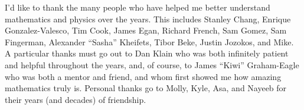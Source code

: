 I'd like to thank the many people who have helped me better understand
mathematics and physics over the years. This includes Stanley Chang,
Enrique Gonzalez-Valesco, Tim Cook, James Egan, Richard French, Sam Gomez,
Sam Fingerman, Alexander ``Sasha'' Kheifets, Tibor Beke, Justin Jozokos, and
Mike. A particular thanks must go out to Dan Klain who was both infinitely
patient and helpful throughout the years, and, of course, to James ``Kiwi''
Graham-Eagle who was both a mentor and friend, and whom first showed me how
amazing mathematics truly is. Personal thanks go to Molly, Kyle, Asa, and Nayeeb
for their years (and decades) of friendship.